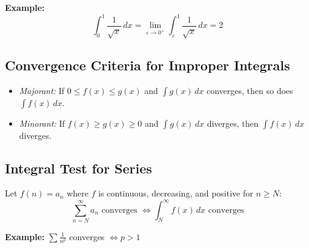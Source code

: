 \textbf{Example:}
\[
\int_0^1 \frac{1}{\sqrt{x}}\,dx = \lim_{\varepsilon \to 0^+} \int_\varepsilon^1 \frac{1}{\sqrt{x}}\,dx = 2
\]

\subsection{Convergence Criteria for Improper Integrals}

\begin{itemize}[label=\(-\)]
\item \emph{Majorant:} If \(0 \le f(x) \le g(x)\) and \(\int g(x)\,dx\) converges, then so does \(\int f(x)\,dx\).
\item \emph{Minorant:} If \(f(x) \ge g(x) \ge 0\) and \(\int g(x)\,dx\) diverges, then \(\int f(x)\,dx\) diverges.
\end{itemize}

\subsection{Integral Test for Series}

Let \(f(n) = a_n\) where \(f\) is continuous, decreasing, and positive for \(n \ge N\):
\[
\sum_{n=N}^\infty a_n \text{ converges } \iff \int_N^\infty f(x)\,dx \text{ converges}
\]

\textbf{Example:} \(\sum \frac{1}{n^p}\) converges \(\iff p > 1\)

\newpage                                                